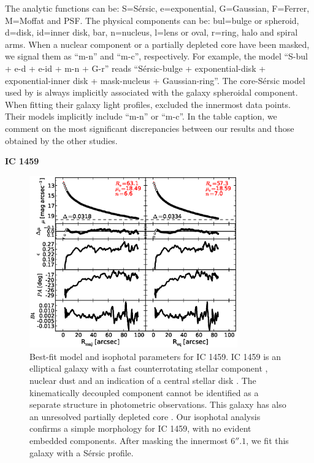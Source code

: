 \documentclass[preprint2]{emulateapj}
\newcommand{\fitfigurewidth}{0.8\textwidth}
\begin{document}
  The analytic functions can be: S=S\'ersic, e=exponential, G=Gaussian, F=Ferrer, M=Moffat and PSF.
  The physical components can be: bul=bulge or spheroid, d=disk, id=inner disk, bar, n=nucleus, l=lens or oval, r=ring, halo and spiral arms. 
  When a nuclear component or a partially depleted core have been masked, we signal them as ``m-n'' and ``m-c'', respectively.
  For example, the model ``S-bul + e-d + e-id + m-n + G-r'' reads ``S\'ersic-bulge + exponential-disk + exponential-inner disk + mask-nucleus + Gaussian-ring''. 
  The core-S\'ersic model used by \cite{rusli2013} is always implicitly associated with the galaxy spheroidal component. 
  When fitting their galaxy light profiles, \citeauthor{grahamdriver2007} excluded the innermost data points. 
  Their models implicitly include ``m-n'' or ``m-c''. 
  In the table caption, we comment on the most significant discrepancies between our results and those obtained by the other studies. 

  \clearpage\newpage\noindent
  {\bf IC 1459 \\}

  \begin{figure}[h]
  \begin{center}
  \includegraphics[width=\fitfigurewidth]{images/ic1459_1Dfit.eps}
  \caption{Best-fit model and isophotal parameters for IC 1459.
  IC 1459 is an elliptical galaxy with a fast counterrotating stellar component \citep{franxillingworth1988ic1459,cappellari2002ic1459},
  nuclear dust and an indication of a central stellar disk \citep{forbes1994ic1459}.
  The kinematically decoupled component cannot be identified as a separate structure in photometric observations.
  This galaxy has also an unresolved partially depleted core \citep{rusli2013}.  %
  Our isophotal analysis confirms a simple morphology for IC 1459, with no evident embedded components.
  After masking the innermost $6''.1$, we fit this galaxy with a S\'ersic profile.  }
  \end{center}
  \end{figure}
\end{document}
